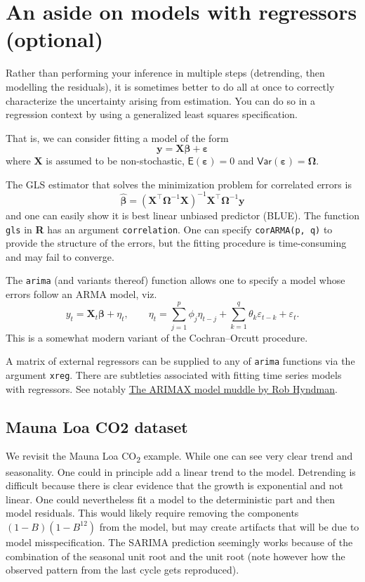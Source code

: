 \documentclass[]{book}
\begin{document}
\section{An aside on models with regressors
(optional)}\label{an-aside-on-models-with-regressors-optional}

Rather than performing your inference in multiple steps (detrending,
then modelling the residuals), it is sometimes better to do all at once
to correctly characterize the uncertainty arising from estimation. You
can do so in a regression context by using a generalized least squares
specification.

That is, we can consider fitting a model of the form
\[\boldsymbol{y} = \mathbf{X}\boldsymbol{\beta}+\boldsymbol{\varepsilon}\]
where \(\mathbf{X}\) is assumed to be non-stochastic,
\(\mathsf{E}(\boldsymbol{\varepsilon}) = 0\) and
\(\mathsf{Var}(\boldsymbol{\varepsilon}) = \boldsymbol{\Omega}\).

The GLS estimator that solves the minimization problem for correlated
errors is
\[\boldsymbol{\hat{\beta}} = (\mathbf{X}^\top\boldsymbol{\Omega}^{-1}\mathbf{X})^{-1}\mathbf{X}^\top\boldsymbol{\Omega}^{-1}\boldsymbol{y}\]
and one can easily show it is best linear unbiased predictor (BLUE). The
function \texttt{gls} in \textbf{R} has an argument
\texttt{correlation}. One can specify \texttt{corARMA(p,\ q)} to provide
the structure of the errors, but the fitting procedure is time-consuming
and may fail to converge.

The \texttt{arima} (and variants thereof) function allows one to specify
a model whose errors follow an ARMA model, viz.
\[ y_t = \mathbf{X}_t\boldsymbol{\beta} + \eta_t, \qquad \eta_t = \sum_{j = 1}^p\phi_j\eta_{t-j} + \sum_{k = 1}^q \theta_k\varepsilon_{t-k} + \varepsilon_t.\]
This is a somewhat modern variant of the Cochran--Orcutt procedure.

A matrix of external regressors can be supplied to any of \texttt{arima}
functions via the argument \texttt{xreg}. There are subtleties
associated with fitting time series models with regressors. See notably
\href{http://robjhyndman.com/hyndsight/arimax/}{The ARIMAX model muddle
by Rob Hyndman}.

\subsection{Mauna Loa CO2 dataset}\label{mauna-loa-co2-dataset}

We revisit the Mauna Loa CO\textsubscript{2} example. While one can see
very clear trend and seasonality. One could in principle add a linear
trend to the model. Detrending is difficult because there is clear
evidence that the growth is exponential and not linear. One could
nevertheless fit a model to the deterministic part and then model
residuals. This would likely require removing the components
\((1-B)(1-B^{12})\) from the model, but may create artifacts that will
be due to model misspecification. The SARIMA prediction seemingly works
because of the combination of the seasonal unit root and the unit root
(note however how the observed pattern from the last cycle gets
reproduced).
\end{document}
